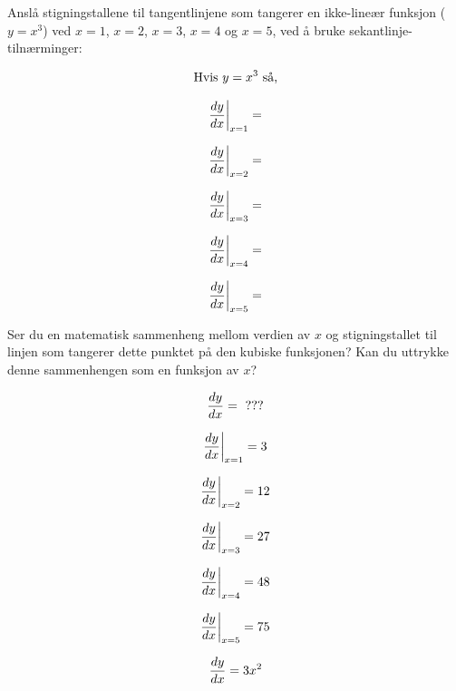 

Anslå stigningstallene til tangentlinjene som tangerer en ikke-lineær funksjon ($y = x^3$) ved $x=1$, $x=2$, $x=3$, $x=4$ og $x=5$, ved å bruke sekantlinje-tilnærminger:

\vskip 10pt

$$\hbox{Hvis } y = x^3 \hbox{ så,}$$

\vskip 20pt

$${{dy \over dx} \bigg|} _ {x=1} = $$

\vskip 20pt

$${{dy \over dx} \bigg|} _ {x=2} = $$

\vskip 20pt

$${{dy \over dx} \bigg|} _ {x=3} = $$

\vskip 20pt

$${{dy \over dx} \bigg|} _ {x=4} = $$

\vskip 20pt

$${{dy \over dx} \bigg|} _ {x=5} = $$

\vskip 20pt

Ser du en matematisk sammenheng mellom verdien av $x$ og stigningstallet til linjen som tangerer dette punktet på den kubiske funksjonen? Kan du uttrykke denne sammenhengen som en funksjon av $x$?

$${dy \over dx} = \hbox{ ???}$$







$${{dy \over dx} \bigg|} _ {x=1} = 3$$

\vskip 20pt

$${{dy \over dx} \bigg|} _ {x=2} = 12$$

\vskip 20pt

$${{dy \over dx} \bigg|} _ {x=3} = 27$$

\vskip 20pt

$${{dy \over dx} \bigg|} _ {x=4} = 48$$

\vskip 20pt

$${{dy \over dx} \bigg|} _ {x=5} = 75$$

\vskip 20pt

$${dy \over dx} = 3x^2$$











